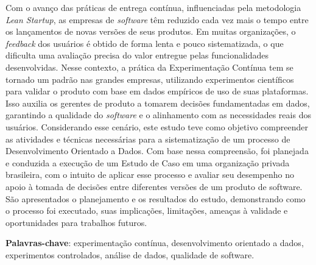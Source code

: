 \begin{resumo}

Com o avanço das práticas de entrega contínua, influenciadas pela metodologia \textit{Lean Startup}, as empresas de \textit{software} têm reduzido cada vez mais o tempo entre os lançamentos de novas versões de seus produtos. Em muitas organizações, o \textit{feedback} dos usuários é obtido de forma lenta e pouco sistematizada, o que dificulta uma avaliação precisa do valor entregue pelas funcionalidades desenvolvidas. Nesse contexto, a prática da Experimentação Contínua tem se tornado um padrão nas grandes empresas, utilizando experimentos científicos para validar o produto com base em dados empíricos de uso de suas plataformas. Isso auxilia os gerentes de produto a tomarem decisões fundamentadas em dados, garantindo a qualidade do \textit{software} e o alinhamento com as necessidades reais dos usuários. Considerando esse cenário, este estudo teve como objetivo compreender as atividades e técnicas necessárias para a sistematização de um processo de Desenvolvimento Orientado a Dados. Com base nessa compreensão, foi planejada e conduzida a execução de um Estudo de Caso em uma organização privada brasileira, com o intuito de aplicar esse processo e avaliar seu desempenho no apoio à tomada de decisões entre diferentes versões de um produto de software. São apresentados o planejamento e os resultados do estudo, demonstrando como o processo foi executado, suas implicações, limitações, ameaças à validade e oportunidades para trabalhos futuros.

\vspace{\onelineskip}

\noindent
\textbf{Palavras-chave}: experimentação contínua, desenvolvimento orientado a dados, experimentos controlados, análise de dados, qualidade de software. 
\end{resumo}
